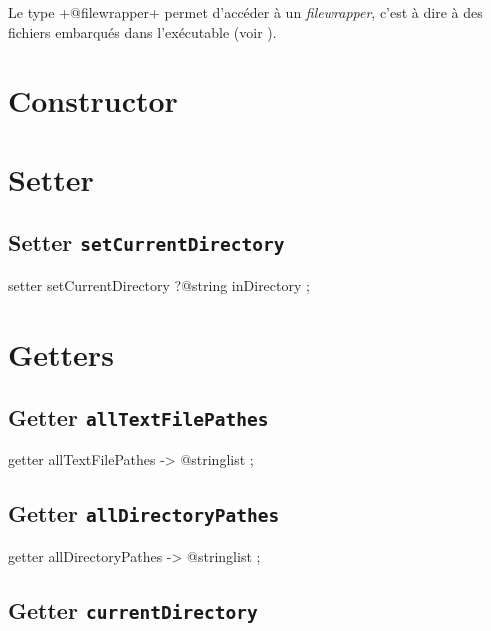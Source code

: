 

Le type \ggs+@filewrapper+ permet d'accéder à un \emph{filewrapper}, c'est à dire à des fichiers embarqués dans l'exécutable (voir ).

\section{Constructor}

\section{Setter}

\subsection{Setter \texttt{setCurrentDirectory}}

\begin{galgas}
setter setCurrentDirectory ?@string inDirectory ;
\end{galgas}


\section{Getters}




\subsection{Getter \texttt{allTextFilePathes}}

\begin{galgas}
getter allTextFilePathes -> @stringlist ;
\end{galgas}






\subsection{Getter \texttt{allDirectoryPathes}}

\begin{galgas}
getter allDirectoryPathes -> @stringlist ;
\end{galgas}






\subsection{Getter \texttt{currentDirectory}}

